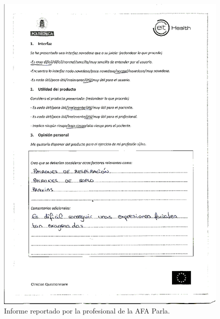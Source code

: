 \begin{figure}
    \centering
    \includegraphics[width=\textwidth]{Images/informe_2.png}
    \caption{Informe reportado por la profesional de la AFA Parla.}
    \label{fig:Informe_2}
\end{figure}